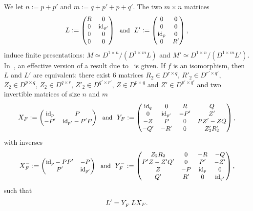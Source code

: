 \documentclass{ifacconf}
\newcommand\id[1]{\text{id}_{#1}}
\begin{document}
We let $n:=p+p'$ and $m:=q+p'+p+q'$. The two $m\times n$ matrices
\begin{equation}\label{equ:def_of_L}
  \begin{small}
    L:=\begin{pmatrix}
    R & 0 \\
    0 & \id{p'} \\
    0 & 0 \\
    0 & 0
    \end{pmatrix}\ \ \text{and}\ \
    L':=\begin{pmatrix}
    0 & 0 \\
    0 & 0 \\
    \id{p} & 0 \\
    0 & R'
    \end{pmatrix},
  \end{small}
\end{equation}
induce finite presentations:  $M\simeq D^{1\times n}/(D^{1\times m}L)$ 
and $M'\simeq D^{1\times n}/(D^{1\times m}L')$. In~\cite{ClQu:11}, an
effective version of a result due to~\cite{Fi:36} is given. If $f$ is an
isomorphism, then $L$ and $L'$ are equivalent: there exist $6$ matrices
$R_2\in D^{r\times q}$, $R'_2\in D^{r'\times q'}$,
$Z_2\in D^{p\times q}$, $Z_2\in D^{q\times r}$,
$Z'_2\in D^{q'\times r'}$, $Z\in D^{p\times q}$ and
$Z'\in D^{p'\times q'}$ and two invertible matrices of size $n$ and $m$
\begin{equation}\label{equ:def_of_XF}
  \begin{small}
    X_F:=\begin{pmatrix}
    \id{p} & P \\
    -P' & \id{p'}-P'P
  \end{pmatrix}\ \ \text{and}\ \
    Y_F:=\begin{pmatrix}
    \id{q} & 0 & R & Q \\
    0 & \id{p'} & -P' & Z' \\
    -Z & P & 0 & PZ'-ZQ \\
    -Q' & -R' & 0 & Z'_2R'_2
    \end{pmatrix},
  \end{small}
\end{equation}
with inverses
\begin{equation}\label{equ:def_of_XF-}
  \begin{small}
    X_F^-:=\begin{pmatrix}
    \id{p}-PP' & -P \\
    P' & \id{p'}
  \end{pmatrix}\ \ \text{and}\ \
    Y_F^-:=\begin{pmatrix}
    Z_2R_2& 0 & -R & -Q \\
    P'Z-Z'Q' & 0 & P' & -Z' \\
    Z & -P & \id{p} & 0 \\
    Q' & R' & 0 & \id{q'}
    \end{pmatrix},
  \end{small}
\end{equation}
such that
\begin{equation}\label{equ:Fitting_equiv}
  \begin{small}
    L'=Y_F^-LX_F.
  \end{small}
\end{equation}
\end{document}
